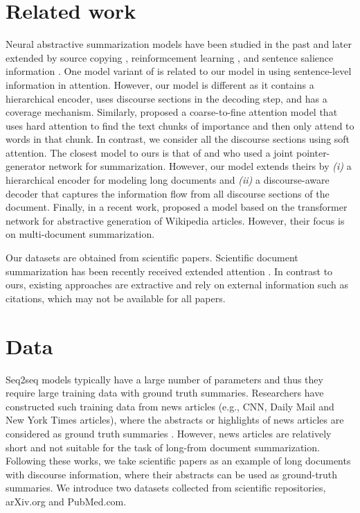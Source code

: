 \documentclass[11pt,a4paper]{article}
\begin{document}
\section{Related work}
Neural abstractive summarization models have been studied in the past \cite{rush2015neural,chopra2016abstractive,nallapati2016abstractive} and later extended by source copying  \cite{miao2016language,see2017get}, reinformcement learning \cite{paulus2017deep}, and sentence salience information \cite{li2017cascaded}. One model variant of  is related to our model in using sentence-level information in attention. However, our model is different as it contains a hierarchical encoder, uses discourse
sections in the decoding step, and has a coverage mechanism. Similarly, \citet{ling-rush:2017:FrontiersSummarization} proposed a coarse-to-fine attention model that uses hard attention to find the text chunks of importance and then only attend to words in that chunk. In contrast, we consider all the discourse sections using soft attention. The closest model to ours is that of  and  who used a joint pointer-generator network for summarization. However, our model extends theirs by \textit{(i)} a hierarchical encoder for modeling long documents and \textit{(ii)} a discourse-aware decoder that captures the information flow from all discourse sections of the document. Finally, in a recent work, \citet{j.2018generating} proposed a model based on the transformer network \cite{vaswani2017attention} for abstractive generation of Wikipedia articles. However, their focus is on multi-document summarization.

Our datasets are obtained from scientific papers. Scientific document summarization has been recently received extended attention \cite{qazvinian2013generating,cohan-goharian:2015:EMNLP,Cohan2017,cohan2017contextualizing}. In contrast to ours, existing approaches are extractive and rely on external information such as citations, which may not be available for all papers.

\section{Data}
Seq2seq models typically have a large number of parameters and thus they require large training data with ground truth summaries. Researchers have constructed such training data from news articles (e.g., CNN, Daily Mail and New York Times articles), where the abstracts or highlights of news articles are considered as ground truth summaries \cite{nallapati2016abstractive,paulus2017deep}. However, news articles are relatively short and not suitable for the task of long-from document summarization.
Following these works, we take scientific papers as an example of long documents with discourse information, where their abstracts can be used as ground-truth summaries. We introduce two datasets collected from scientific repositories, arXiv.org and PubMed.com.
\end{document}
